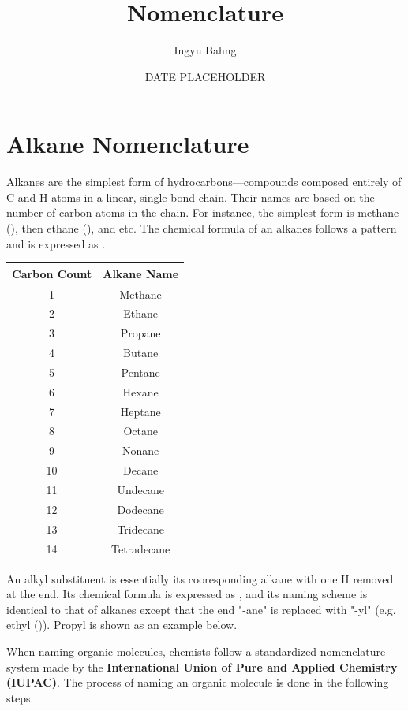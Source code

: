 \documentclass[10pt]{article}
\title{Nomenclature}
\date{DATE PLACEHOLDER}
\author{Ingyu Bahng}
\begin{document}


\section{Alkane Nomenclature}

  Alkanes are the simplest form of hydrocarbons---compounds composed entirely of C and H atoms in a linear, single-bond chain. Their names are based on the number of carbon atoms in the chain. For instance, the simplest form is methane (), then ethane (), and etc. The chemical formula of an alkanes follows a pattern and is expressed as .

  \begin{center}
  \begin{tabular}{cc}
  \hline
  Carbon Count & Alkane Name \\
  \hline
  1 & Methane \\
  2 & Ethane \\
  3 & Propane \\
  4 & Butane \\
  5 & Pentane \\
  6 & Hexane \\
  7 & Heptane \\
  8 & Octane \\
  9 & Nonane \\
  10 & Decane \\
  11 & Undecane \\
  12 & Dodecane \\
  13 & Tridecane \\
  14 & Tetradecane \\
  \hline
  \end{tabular}
  \end{center}

  An alkyl substituent is essentially its cooresponding alkane with one H removed at the end. Its chemical formula is expressed as , and its naming scheme is identical to that of alkanes except that the end "-ane" is replaced with "-yl" (e.g. ethyl ()). Propyl is shown as an example below.


  When naming organic molecules, chemists follow a standardized nomenclature system made by the \textbf{International Union of Pure and Applied Chemistry (IUPAC)}. The process of naming an organic molecule is done in the following steps.
\end{document}
